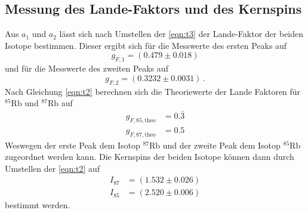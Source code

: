 \subsection{Messung des Lande-Faktors und des Kernspins}
Aus $a_1$ und $a_2$ lässt sich nach Umstellen der \autoref{eqn:t3} der Lande-Faktor der beiden Isotope bestimmen.
Dieser ergibt sich für die Messwerte des ersten Peaks auf 
\begin{equation}
  g_{F, 1} = \left(0.479 \pm 0.018 \right)
\end{equation} 
und für die Messwerte des zweiten Peaks auf
\begin{equation}
  g_{F, 2} = \left(0.3232 \pm 0.0031 \right) \, .
\end{equation}
Nach Gleichung \autoref{eqn:t2} berechnen sich die Theoriewerte der Lande Faktoren für ${}^{85}\text{Rb}$ und ${}^{87}\text{Rb}$ auf 
\begin{align*}
  g_{F, 85, \text{theo}} &= 0.\bar{3} \\
  g_{F, 87, \text{theo}} &= 0.5
\end{align*}
Weswegen der erste Peak dem Isotop ${}^{87}\text{Rb}$ und der zweite Peak dem Isotop ${}^{85}\text{Rb}$ zugeordnet werden kann.
Die Kernspins der beiden Isotope können dann durch Umstellen der \autoref{eqn:t2} auf 
\begin{align*}
  I_{87} &= \left(1.532 \pm 0.026\right) \\
  I_{85} &= \left(2.520 \pm 0.006\right)
\end{align*}
bestimmt werden.
